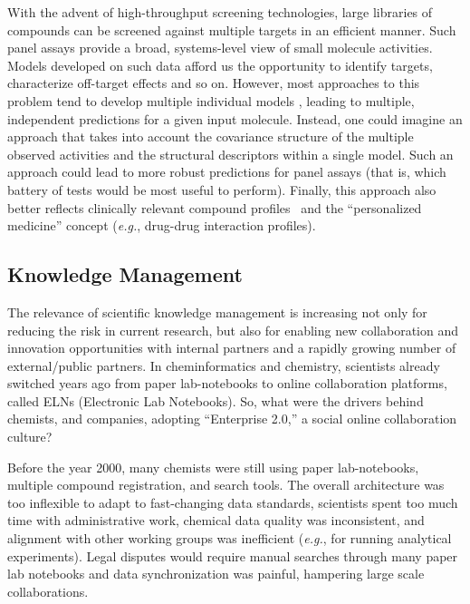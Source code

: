\documentclass{sig-alternate}
\begin{document}
With the advent of high-throughput screening technologies, large
libraries of compounds can be screened against multiple targets in an
efficient manner. Such panel assays provide a broad, systems-level
view of small molecule activities.  Models developed on such data
afford us the opportunity to identify targets, characterize off-target
effects and so on. However, most approaches to this problem tend to
develop multiple individual models \cite{Chen:2010zr}, leading to
multiple, independent predictions for a given input molecule.
Instead, one could imagine an approach that takes into account the
covariance structure of the multiple observed activities and the
structural descriptors within a single model. Such an approach could
lead to more robust predictions for panel assays (that is, which
battery of tests would be most useful to perform). Finally, this
approach also better reflects clinically relevant compound
profiles~\cite{kuhn2010} and the ``personalized medicine'' concept
(\emph{e.g.}, drug-drug interaction profiles).

\subsection{Knowledge Management}
\label{sec:knowledge-management}

The relevance of scientific knowledge management is increasing not
only for reducing the risk in current research, but also for enabling
new collaboration and innovation opportunities with internal partners and
a rapidly growing number of external/public partners. In
cheminformatics and chemistry, scientists already switched years
ago from paper lab-notebooks to online collaboration platforms, called
ELNs (Electronic Lab Notebooks). So, what were the drivers behind
chemists, and companies, adopting ``Enterprise 2.0,'' a social online
collaboration culture?

Before the year 2000, many chemists were still using paper
lab-notebooks, multiple compound registration, and search
tools. The overall architecture was too inflexible to
adapt to fast-changing data standards, scientists spent too much time
with administrative work, chemical data quality was inconsistent, and
alignment with other working groups was inefficient (\emph{e.g.}, for
running analytical experiments). Legal disputes would require manual
searches through many paper lab notebooks and data synchronization was
painful, hampering large scale collaborations.

\end{document}
